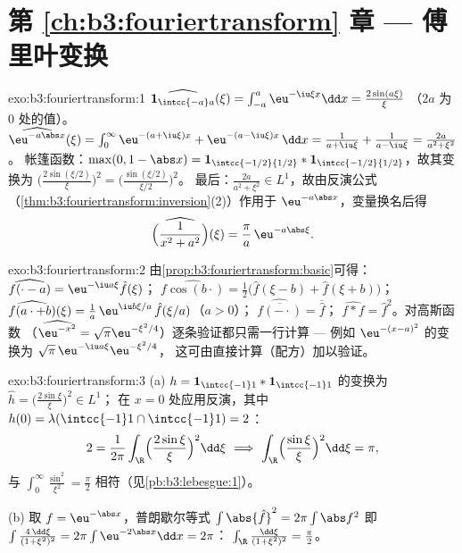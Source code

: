 \section*{第 \ref{ch:b3:fouriertransform} 章 ---
傅里叶变换}

\begin{solution}{exo:b3:fouriertransform:1}
$\widehat{\mathbf 1_{\intcc{-a}a}}(\xi) =
\int_{-a}^a\eu^{-\iu\xi x}\dd x = \frac{2\sin(a\xi)}{\xi}$
（$2a$ 为 $0$ 处的值）。
$\widehat{\eu^{-a\abs x}}(\xi) = \int_0^\infty\eu^{-(a +
\iu\xi)x} + \eu^{-(a - \iu\xi)x}\,\dd x = \frac1{a + \iu\xi} +
\frac1{a - \iu\xi} = \frac{2a}{a^2 + \xi^2}$。
帐篷函数：$\max(0, 1 - \abs x) = \mathbf 1_{\intcc{-1/2}{1/2}} *
\mathbf 1_{\intcc{-1/2}{1/2}}$，故其变换为
$\bigl(\frac{2\sin(\xi/2)}\xi\bigr)^2 =
\bigl(\frac{\sin(\xi/2)}{\xi/2}\bigr)^2$。
最后：$\frac{2a}{a^2+\xi^2} \in L^1$，故由反演公式
（\cref{thm:b3:fouriertransform:inversion}(2)）作用于
$\eu^{-a\abs x}$，变量换名后得
\[
\widehat{\Bigl(\frac1{x^2 + a^2}\Bigr)}(\xi) =
\frac{\pi}{a}\,\eu^{-a\abs\xi} .
\]
\end{solution}

\begin{solution}{exo:b3:fouriertransform:2}
由\cref{prop:b3:fouriertransform:basic}可得：
$\widehat{f(\cdot - a)} = \eu^{-\iu a\xi}\hat f(\xi)$；
$\widehat{f\cos(b\cdot)} = \frac12\bigl(\hat f(\xi - b) + \hat
f(\xi + b)\bigr)$；
$\widehat{f(a\cdot + b)}(\xi) = \frac1a\,\eu^{\iu
b\xi/a}\,\hat f(\xi/a)$（$a > 0$）；
$\widehat{\overline{f(-\cdot)}} = \overline{\hat f}$；
$\widehat{f * f} = \hat f^2$。对高斯函数
（$\widehat{\eu^{-x^2}} = \sqrt\pi\eu^{-\xi^2/4}$）逐条验证都只需一行计算 ---
例如 $\eu^{-(x-a)^2}$ 的变换为
$\sqrt\pi\,\eu^{-\iu a\xi}\eu^{-\xi^2/4}$，
这可由直接计算（配方）加以验证。
\end{solution}

\begin{solution}{exo:b3:fouriertransform:3}
(a) $h = \mathbf 1_{\intcc{-1}1}*\mathbf 1_{\intcc{-1}1}$ 的变换为
$\hat h = \bigl(\frac{2\sin\xi}\xi\bigr)^2 \in L^1$；
在 $x = 0$ 处应用反演，其中 $h(0) = \lambda(\intcc{-1}1\cap\intcc{-1}1)
= 2$：
\[
2 = \frac1{2\pi}\int_\R\Bigl(\frac{2\sin\xi}\xi\Bigr)^2
\dd\xi
\ \Longrightarrow\
\int_\R\Bigl(\frac{\sin\xi}\xi\Bigr)^2\dd\xi = \pi ,
\]
与 $\int_0^\infty\frac{\sin^2}{\xi^2} =
\frac\pi2$ 相符（见\cref{pb:b3:lebesgue:1}）。

(b) 取 $f = \eu^{-\abs x}$，普朗歇尔等式 $\int\abs{\hat f}^2 =
2\pi\int\abs f^2$ 即 $\int\frac{4\,\dd\xi}{(1 + \xi^2)^2} =
2\pi\int\eu^{-2\abs x}\dd x = 2\pi$：
$\int_\R\frac{\dd\xi}{(1+\xi^2)^2} = \frac\pi2$。
\end{solution}


